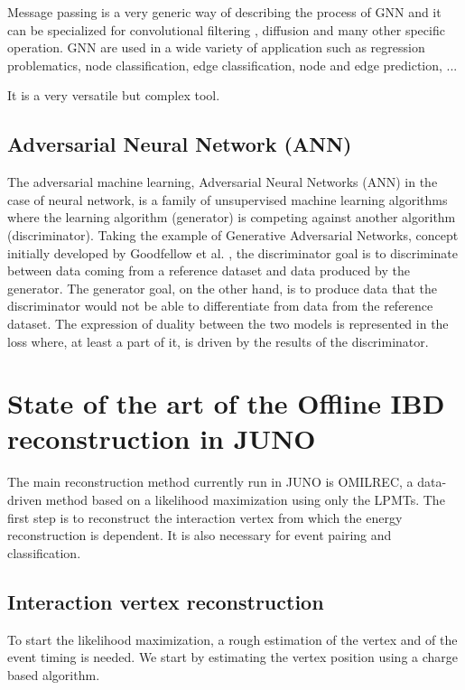 \documentclass[../main.tex]{subfiles}
\begin{document}
Message passing is a very generic way of describing the process of GNN and it can be specialized for convolutional filtering \cite{defferrard_convolutional_2017}, diffusion \cite{li_diffusion_2018} and many other specific operation. GNN are used in a wide variety of application such as regression problematics, node classification, edge classification, node and edge prediction, ...


It is a very versatile but complex tool.

\subsection{Adversarial Neural Network (ANN)}

The adversarial machine learning, Adversarial Neural Networks (ANN) in the case of neural network, is a family of unsupervised machine learning algorithms where the learning algorithm (generator) is competing against another algorithm (discriminator). Taking the example of Generative Adversarial Networks, concept initially developed by Goodfellow et al. \cite{goodfellow_generative_2014}, the discriminator goal is to discriminate between data coming from a reference dataset and data produced by the generator.
The generator goal, on the other hand, is to produce data that the discriminator would not be able to differentiate from data from the reference dataset. The expression of duality between the two models is represented in the loss where, at least a part of it, is driven by the results of the discriminator.

\section{State of the art of the Offline IBD reconstruction in JUNO}
\label{sec:juno:reco}

The main reconstruction method currently run in JUNO is OMILREC, a data-driven method based on a likelihood maximization \cite{wu_new_2019, huang_improving_2021} using only the LPMTs. The first step is to reconstruct the interaction vertex from which the energy reconstruction is dependent. It is also necessary for event pairing and classification.

\subsection{Interaction vertex reconstruction}

To start the likelihood maximization, a rough estimation of the vertex and of the event timing is needed. We start by estimating the vertex position using a charge based algorithm.
\end{document}
